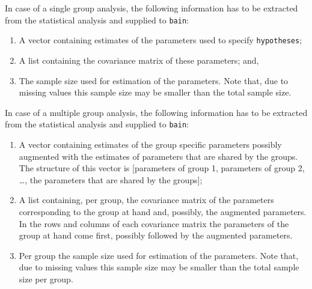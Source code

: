 \documentclass[
]{book}
\providecommand{\tightlist}{%
  \setlength{\itemsep}{0pt}\setlength{\parskip}{0pt}}
\begin{document}
In case of a single group analysis, the
following information has to be extracted from the statistical analysis and
supplied to \texttt{bain}:

\begin{enumerate}
\def\labelenumi{\alph{enumi})}
\tightlist
\item
  A vector containing estimates of the parameters
  used to specify \texttt{hypotheses};
\item
  A list containing the covariance matrix of these parameters; and,
\item
  The sample size used for estimation of the parameters. Note that,
  due to missing values this sample size may be smaller than the total sample
  size.
\end{enumerate}

In case of a multiple group
analysis, the following information has to be extracted from the statistical
analysis and supplied to \texttt{bain}:

\begin{enumerate}
\def\labelenumi{\alph{enumi})}
\tightlist
\item
  A vector containing estimates of the group specific
  parameters possibly augmented with the
  estimates of parameters that are shared by the groups. The structure
  of this vector is
  {[}parameters of group 1, parameters of group 2, \ldots, the parameters that
  are shared by the groups{]};
\item
  A list containing, per group, the covariance
  matrix of the parameters corresponding to the group at hand and, possibly,
  the augmented parameters. In the rows and columns of each covariance matrix
  the parameters of the group at hand come first, possibly followed by the
  augmented parameters.
\item
  Per group the sample size used for estimation of the parameters. Note that,
  due to missing values this sample size may be smaller than the total sample
  size per group.
\end{enumerate}
\end{document}
